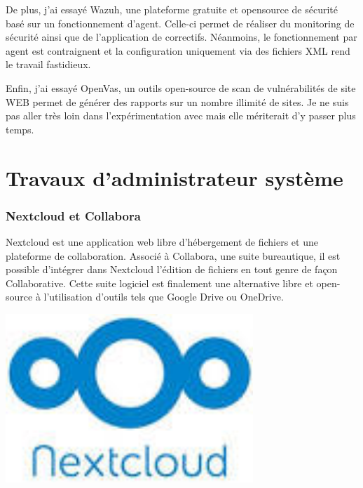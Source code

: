 \documentclass[12pt]{article}
\begin{document}
De plus, j'ai essayé Wazuh, une plateforme gratuite et opensource de sécurité basé sur un fonctionnement d'agent. 
Celle-ci permet de réaliser du monitoring de sécurité ainsi que de l'application de correctifs.
Néanmoins, le fonctionnement par agent est contraignent et la configuration uniquement via des fichiers XML rend le travail fastidieux.

Enfin, j'ai essayé OpenVas, un outils open-source de scan de vulnérabilités de site WEB permet de générer des rapports sur un nombre illimité de sites. 
Je ne suis pas aller très loin dans l'expérimentation avec mais elle mériterait d'y passer plus temps.

\newpage
\part{Travaux d'administrateur système}
\section{Nextcloud et Collabora}
\noindent%
\begin{minipage}{.7\textwidth}%
\gls{Nextcloud} est une application web libre d'hébergement de fichiers et une plateforme de collaboration. 
Associé à \gls{Collabora}, une suite bureautique, il est possible d'intégrer dans \gls{Nextcloud} l'édition de fichiers en tout genre de façon Collaborative. 
Cette suite logiciel est finalement une alternative libre et open-source à l'utilisation d'outils tels que Google Drive ou OneDrive.
\end{minipage}%
\hfill
\begin{minipage}{.3\textwidth}%
\begin{center}
\includegraphics[width=0.7\textwidth]{src/logo_nextcloud.jpeg}
\end{center}
\end{minipage}%
\end{document}

